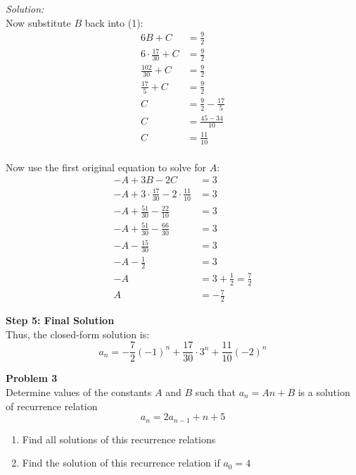 \documentclass[11pt,letterpaper]{article}
\newenvironment{problem}[2][Problem]                                  
        { \begin{mdframed}[backgroundcolor=gray!20] \textbf{#1 #2} \\}
        {  \end{mdframed}}
\newenvironment{solution}                      
        {\begin{mdframed}\textit{Solution:} \\}
        {\end{mdframed}}
\begin{document}
\begin{solution}
Now substitute $B$ back into (1):
\begin{align*}
  6B + C &= \frac{9}{2} \\
  6 \cdot \frac{17}{30} + C &= \frac{9}{2} \\
  \frac{102}{30} + C &= \frac{9}{2} \\
  \frac{17}{5} + C &= \frac{9}{2} \\
  C &= \frac{9}{2} - \frac{17}{5} \\
  C &= \frac{45 - 34}{10} \\
  C &= \frac{11}{10}\\
\end{align*}

Now use the first original equation to solve for $A$:
\begin{align*}
-A + 3B - 2C &= 3 \\
-A + 3 \cdot \frac{17}{30} - 2 \cdot \frac{11}{10} &= 3 \\
-A + \frac{51}{30} - \frac{22}{10} &= 3 \\
-A + \frac{51}{30} - \frac{66}{30} &= 3 \\
-A - \frac{15}{30} &= 3 \\
-A - \frac{1}{2} &= 3 \\
-A &= 3 + \frac{1}{2} = \frac{7}{2} \\
A &= -\frac{7}{2}
\end{align*}

\noindent\textbf{Step 5: Final Solution}\\
Thus, the closed-form solution is:
\[
\boxed{
a_n = -\frac{7}{2}(-1)^n + \frac{17}{30} \cdot 3^n + \frac{11}{10}(-2)^n
}
\]
\end{solution}


\begin{problem}{3}
Determine values of the constants $A$ and $B$ such that $a_n = An+B$ is a solution of recurrence relation
\[
  a_n = 2a_{n-1} + n + 5
\]
\begin{enumerate}
  \item Find all solutions of this recurrence relations
  \item Find the solution of this recurrence relation if $a_0 = 4$
\end{enumerate}
\end{problem}
\end{document}
